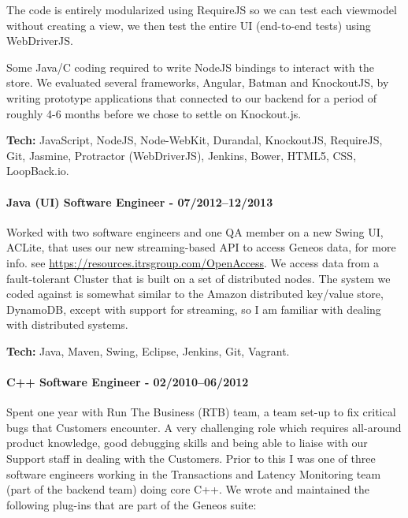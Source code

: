 \documentclass[
  a4paper,
  8pt,
]{article}
\begin{document}
\begin{multicols}{2}
The code is entirely modularized using RequireJS so we can test each
viewmodel without creating a view, we then test the entire UI
(end-to-end tests) using WebDriverJS.

Some Java/C coding required to write NodeJS bindings to interact with
the store. We evaluated several frameworks, Angular, Batman and
KnockoutJS, by writing prototype applications that connected to our
backend for a period of roughly 4-6 months before we chose to settle on
Knockout.js.

\textbf{Tech:} JavaScript, NodeJS, Node-WebKit, Durandal, KnockoutJS,
RequireJS, Git, Jasmine, Protractor (WebDriverJS), Jenkins, Bower,
HTML5, CSS, LoopBack.io.

\hypertarget{java-ui-software-engineer---072012122013}{%
\paragraph{Java (UI) Software Engineer -
07/2012--12/2013}\label{java-ui-software-engineer---072012122013}}

Worked with two software engineers and one QA member on a new Swing UI,
ACLite, that uses our new streaming-based API to access Geneos data, for
more info. see \url{https://resources.itrsgroup.com/OpenAccess}. We
access data from a fault-tolerant Cluster that is built on a set of
distributed nodes. The system we coded against is somewhat similar to
the Amazon distributed key/value store, DynamoDB, except with support
for streaming, so I am familiar with dealing with distributed systems.

\textbf{Tech:} Java, Maven, Swing, Eclipse, Jenkins, Git, Vagrant.

\hypertarget{c-software-engineer---022010062012}{%
\paragraph{C++ Software Engineer -
02/2010--06/2012}\label{c-software-engineer---022010062012}}

Spent one year with Run The Business (RTB) team, a team set-up to fix
critical bugs that Customers encounter. A very challenging role which
requires all-around product knowledge, good debugging skills and being
able to liaise with our Support staff in dealing with the Customers.
Prior to this I was one of three software engineers working in the
Transactions and Latency Monitoring team (part of the backend team)
doing core C++. We wrote and maintained the following plug-ins that are
part of the Geneos suite:


\end{multicols}
\end{document}
